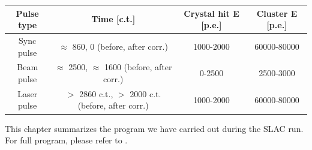 \begin{table}[htbp]
\caption{Typical time and energy of sync, beam and laser pulses.}
\begin{longtable}{|c|c|c|c|} \hline
Pulse type & Time [c.t.] & Crystal hit E [p.e.] & Cluster E [p.e.] \\
\hline
Sync pulse	& $\approx$ 860, 0 (before, after corr.) &	1000-2000 &	60000-80000 \\
\hline
Beam pulse & $\approx$ 2500, $\approx$ 1600 (before, after corr.)	 & 0-2500 & 2500-3000 \\
\hline
Laser pulse	& $>$ 2860 c.t., $>$ 2000 c.t. (before, after corr.) & 1000-2000 & 60000-80000 \\
\hline
\end{longtable}
\end{table}

This chapter summarizes the program we have carried out during the SLAC run. For full program, please refer to .

